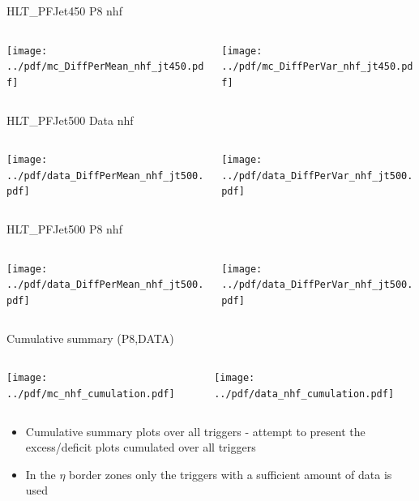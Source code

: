 \documentclass[9pt]{beamer}
\begin{document}
\begin{frame}[t]{HLT\_PFJet450 P8 nhf}
\begin{columns}[T]
  \begin{column}{.5\textwidth}
  \texttt{[image: ../pdf/mc\_DiffPerMean\_nhf\_jt450.pdf]}
  \end{column}
  \begin{column}{.5\textwidth}
  \texttt{[image: ../pdf/mc\_DiffPerVar\_nhf\_jt450.pdf]}
  \end{column}
\end{columns}
\end{frame}

\begin{frame}[t]{HLT\_PFJet500 Data nhf}
\begin{columns}[T]
  \begin{column}{.5\textwidth}
  \texttt{[image: ../pdf/data\_DiffPerMean\_nhf\_jt500.pdf]}
  \end{column}
  \begin{column}{.5\textwidth}
  \texttt{[image: ../pdf/data\_DiffPerVar\_nhf\_jt500.pdf]}
  \end{column}
\end{columns}
\end{frame}

\begin{frame}[t]{HLT\_PFJet500 P8 nhf}
\begin{columns}[T]
  \begin{column}{.5\textwidth}
  \texttt{[image: ../pdf/data\_DiffPerMean\_nhf\_jt500.pdf]}
  \end{column}
  \begin{column}{.5\textwidth}
  \texttt{[image: ../pdf/data\_DiffPerVar\_nhf\_jt500.pdf]}
  \end{column}
\end{columns}
\end{frame}

\begin{frame}[t]{Cumulative summary (P8,DATA)}
\begin{columns}[T]
  \begin{column}{.5\textwidth}
  \texttt{[image: ../pdf/mc\_nhf\_cumulation.pdf]}
  \end{column}
  \begin{column}{.5\textwidth}
  \texttt{[image: ../pdf/data\_nhf\_cumulation.pdf]}
  \end{column}
\end{columns}
\begin{itemize}
 \item Cumulative summary plots over all triggers - attempt to present the excess/deficit plots cumulated over all triggers
 \item In the $\eta$ border zones only the triggers with a sufficient amount of data is used
\end{itemize}
\end{frame}
\end{document}
